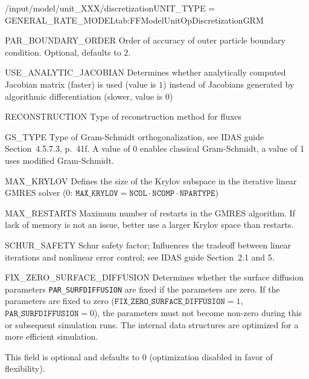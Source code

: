 \begin{condsubgroup}{/input/model/unit\_XXX/discretization}{UNIT\_TYPE = GENERAL\_RATE\_MODEL}{tab:FFModelUnitOpDiscretizationGRM}
  \begin{dataset}[type=int,range={$\{ 1,2 \}$},length={1}]{PAR\_BOUNDARY\_ORDER}
    Order of accuracy of outer particle boundary condition.
    Optional, defaults to $2$.
  \end{dataset}
  \begin{dataset}[type=int,range={$\{0, 1\}$},length=1]{USE\_ANALYTIC\_JACOBIAN}
    Determines whether analytically computed Jacobian matrix (faster) is used (value is $1$) instead of Jacobians generated by algorithmic differentiation (slower, value is $0$)
  \end{dataset}
  \begin{dataset}[type=string,range={\texttt{WENO}},length={1}]{RECONSTRUCTION}
    Type of reconstruction method for fluxes
  \end{dataset}
  \begin{dataset}[type=int,range={$\{0, 1\}$},length=1]{GS\_TYPE}
    Type of Gram-Schmidt orthogonalization, see IDAS guide Section~4.5.7.3, p.~41f.
    A value of $0$ enables classical Gram-Schmidt, a value of 1 uses modified Gram-Schmidt.
  \end{dataset}
  \begin{dataset}[type=int,range={$\{0, \dots, \texttt{NCOL} \cdot \texttt{NCOMP} \cdot \texttt{NPARTYPE} \}$},length=1]{MAX\_KRYLOV}
    Defines the size of the Krylov subspace in the iterative linear GMRES solver (0: $\texttt{MAX\_KRYLOV} = \texttt{NCOL} \cdot \texttt{NCOMP} \cdot \texttt{NPARTYPE}$)
  \end{dataset}
  \begin{dataset}[type=int,range={$\geq 0$},length=1]{MAX\_RESTARTS}
    Maximum number of restarts in the GMRES algorithm. If lack of memory is not an issue, better use a larger Krylov space than restarts.
  \end{dataset}
  \begin{dataset}[type=double,range={$\geq 0$},length=1]{SCHUR\_SAFETY}
    Schur safety factor; Influences the tradeoff between linear iterations and nonlinear error control; see IDAS guide Section~2.1 and 5.
  \end{dataset}
  \begin{dataset}[type=int,range={$\{0, 1\}$},length=1]{FIX\_ZERO\_SURFACE\_DIFFUSION}
    Determines whether the surface diffusion parameters \texttt{PAR\_SURFDIFFUSION} are fixed if the parameters are zero.
    If the parameters are fixed to zero ($\texttt{FIX\_ZERO\_SURFACE\_DIFFUSION} = 1$, $\texttt{PAR\_SURFDIFFUSION} = 0$), the parameters must not become non-zero during this or subsequent simulation runs.
    The internal data structures are optimized for a more efficient simulation.

    This field is optional and defaults to $0$ (optimization disabled in favor of flexibility).
  \end{dataset}
\end{condsubgroup}


